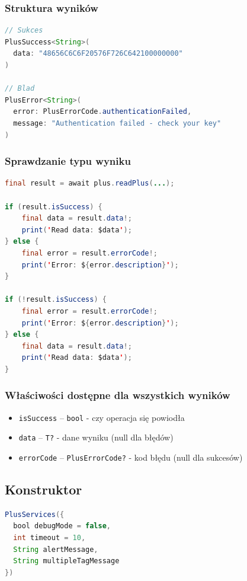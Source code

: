 \documentclass[a4paper,12pt]{article}
\begin{document}
\subsubsection*{Struktura wyników}
\begin{lstlisting}[language=Java]
// Sukces
PlusSuccess<String>(
  data: "48656C6C6F20576F726C642100000000"
)

// Blad
PlusError<String>(
  error: PlusErrorCode.authenticationFailed,
  message: "Authentication failed - check your key"
)
\end{lstlisting}

\subsubsection*{Sprawdzanie typu wyniku}
\begin{lstlisting}[language=Java]
final result = await plus.readPlus(...);

if (result.isSuccess) {
    final data = result.data!;
    print('Read data: $data');
} else {
    final error = result.errorCode!;
    print('Error: ${error.description}');
}

if (!result.isSuccess) {
    final error = result.errorCode!;
    print('Error: ${error.description}');
} else {
    final data = result.data!;
    print('Read data: $data');
}
\end{lstlisting}

\subsubsection*{Właściwości dostępne dla wszystkich wyników}
\begin{itemize}
    \item \texttt{isSuccess} -- \texttt{bool} - czy operacja się powiodła
    \item \texttt{data} -- \texttt{T?} - dane wyniku (null dla błędów)
    \item \texttt{errorCode} -- \texttt{PlusErrorCode?} - kod błędu (null dla sukcesów)
\end{itemize}

\newpage

\subsection{Konstruktor}
\begin{lstlisting}[language=Java]
PlusServices({
  bool debugMode = false, 
  int timeout = 10, 
  String alertMessage, 
  String multipleTagMessage
})
\end{lstlisting}
\end{document}
